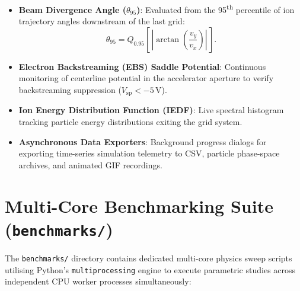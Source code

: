 \documentclass[11pt,a4paper]{article}
\begin{document}
\begin{itemize}[nosep]
    \item \textbf{Beam Divergence Angle ($\theta_{95}$)}: Evaluated from the 95\textsuperscript{th} percentile of ion trajectory angles downstream of the last grid:
    \begin{equation}
        \theta_{95} = Q_{0.95}\!\left[\,\left|\arctan\left(\frac{v_y}{v_x}\right)\right|\,\right].
    \end{equation}
    \item \textbf{Electron Backstreaming (EBS) Saddle Potential}: Continuous monitoring of centerline potential in the accelerator aperture to verify backstreaming suppression ($V_{\mathrm{sp}} < -5\,\si{\volt}$).
    \item \textbf{Ion Energy Distribution Function (IEDF)}: Live spectral histogram tracking particle energy distributions exiting the grid system.
    \item \textbf{Asynchronous Data Exporters}: Background progress dialogs for exporting time-series simulation telemetry to CSV, particle phase-space archives, and animated GIF recordings.
\end{itemize}

\section{Multi-Core Benchmarking Suite (\texttt{benchmarks/})}

The \texttt{benchmarks/} directory contains dedicated multi-core physics sweep scripts utilising Python's \texttt{multiprocessing} engine to execute parametric studies across independent CPU worker processes simultaneously:
\end{document}
